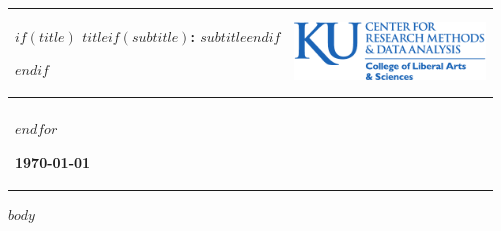 \documentclass[$if(fontsize)$$fontsize$$endif$,english,letterpaper]{scrartcl}
\providecommand{\tabularnewline}{\\}
\begin{document}
\begin{minipage}[t]{1\columnwidth}%
\begin{center}
\begin{tabular}[t]{>{\raggedright}p{4in}>{\centering}p{2.25in}}
\hline 
\medskip{}
$if(title)$
\textsc{\Large{}$title$$if(subtitle)$: $subtitle$$endif$}{\Large \par}
$endif$

\medskip{}
  & \medskip{}


\includegraphics[width=2in]{theme/CRMDA_logo}\tabularnewline
\hline

\multicolumn{2}{>{\raggedright}p{6in}}{\medskip{}
$for(author)$$author.name$,
  $author.description$, $author.affiliation$ <$author.email$> \\
$endfor$


\begin{singlespace}
\raggedright{}\textbf{\today}
\end{singlespace}
}\tabularnewline
\hline 
\end{tabular}
\par\end{center}
\medskip{}

\end{minipage}

$body$
\end{document}
